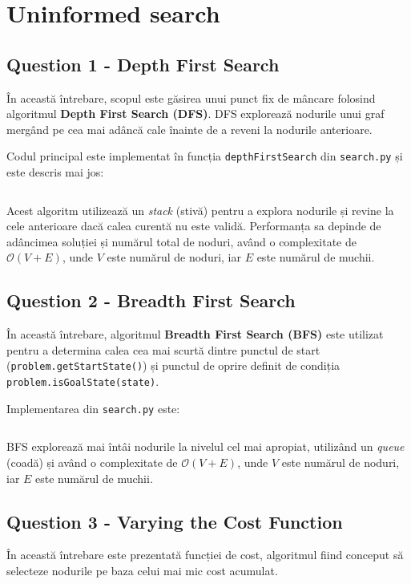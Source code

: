 \section{Uninformed search}
\subsection{Question 1 - Depth First Search}
\par În această întrebare, scopul este găsirea unui punct fix de mâncare folosind algoritmul \textbf{Depth First Search (DFS)}. DFS explorează nodurile unui graf mergând pe cea mai adâncă cale înainte de a reveni la nodurile anterioare.

\par Codul principal este implementat în funcția \texttt{depthFirstSearch} din \texttt{search.py} și este descris mai jos:

\inputminted[linenos]{python}{code/depth_first_search.py}
\par Acest algoritm utilizează un \textit{stack} (stivă) pentru a explora nodurile și revine la cele anterioare dacă calea curentă nu este validă. Performanța sa depinde de adâncimea soluției și numărul total de noduri, având o complexitate de \( \mathcal{O}(V + E) \), unde \( V \) este numărul de noduri, iar \( E \) este numărul de muchii.


\subsection{Question 2 - Breadth First Search}
\par În această întrebare, algoritmul \textbf{Breadth First Search (BFS)} este utilizat pentru a determina calea cea mai scurtă dintre punctul de start (\texttt{problem.getStartState()}) și punctul de oprire definit de condiția \texttt{problem.isGoalState(state)}.

\par Implementarea din \texttt{search.py} este:
\inputminted[linenos]{python}{code/breadth_first_search.py}
\par  BFS explorează mai întâi nodurile la nivelul cel mai apropiat, utilizând un \textit{queue} (coadă) și având o complexitate de \( \mathcal{O}(V + E) \), unde \( V \) este numărul de noduri, iar \( E \) este numărul de muchii.

\subsection{Question 3 - Varying the Cost Function}
\par În această întrebare este prezentată funcției de cost, algoritmul fiind conceput să selecteze nodurile pe baza celui mai mic cost acumulat. 

